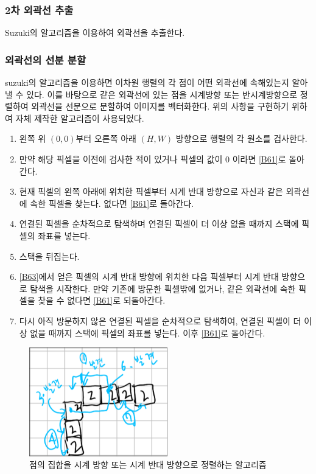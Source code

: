 \documentclass[conference]{IEEEtran}
\begin{document}
\subsubsection{2차 외곽선 추출}
Suzuki의 알고리즘\cite{suzuki}을 이용하여 외곽선을 추출한다.

\subsubsection{외곽선의 선분 분할}
suzuki의 알고리즘을 이용하면 이차원 행렬의 각 점이 어떤 외곽선에 속해있는지 알아낼 수 있다.
이를 바탕으로 같은 외곽선에 있는 점을 시계방향 또는 반시계방향으로 정렬하여 외곽선을 선분으로 분할하여 이미지를 벡터화한다.
위의 사항을 구현하기 위하여 자체 제작한 알고리즘이 사용되었다. 
\begin{enumerate}
    \item 왼쪽 위 $(0, 0)$부터 오른쪽 아래 $(H, W)$ 방향으로 행렬의 각 원소를 검사한다. \label{B61}
    \item 만약 해당 픽셀을 이전에 검사한 적이 있거나 픽셀의 값이 0 이라면 \ref{B61}로 돌아간다.
    \item 현재 픽셀의 왼쪽 아래에 위치한 픽셀부터 시계 반대 방향으로 자신과 같은 외곽선에 속한 픽셀을 찾는다. 없다면 \ref{B61}로 돌아간다. \label{B63}
    \item 연결된 픽셀을 순차적으로 탐색하며 연결된 픽셀이 더 이상 없을 때까지 스택에 픽셀의 좌표를 넣는다.
    \item 스택을 뒤집는다.
    \item \ref{B63}에서 얻은 픽셀의 시계 반대 방향에 위치한 다음 픽셀부터 시계 반대 방향으로 탐색을 시작한다.
    만약 기존에 방문한 픽셀밖에 없거나, 같은 외곽선에 속한 픽셀을 찾을 수 없다면 \ref{B61}로 되돌아간다.
    \item 다시 아직 방문하지 않은 연결된 픽셀을 순차적으로 탐색하여, 연결된 픽셀이 더 이상 없을 때까지 스택에 픽셀의 좌표를 넣는다. 이후 \ref{B61}로 돌아간다.
\end{enumerate}
\begin{figure}
    \centering
    \includegraphics[width=6cm]{algo.png}
    \caption{점의 집합을 시계 방향 또는 시계 반대 방향으로 정렬하는 알고리즘}
\end{figure}
\end{document}
